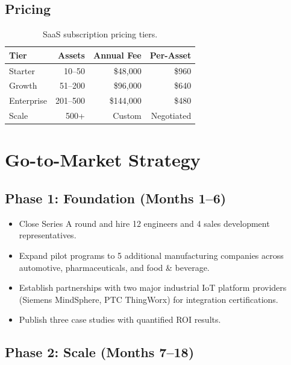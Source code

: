 \documentclass[
    language=english,
    doctype=business-plan,
    institution=none,
]{../../omnilatex}
\begin{document}
\subsection{Pricing}

\begin{table}[h]
    \centering
    \begin{tabular}{lrrr}
        \toprule
        \textbf{Tier} & \textbf{Assets} & \textbf{Annual Fee} & \textbf{Per-Asset} \\
        \midrule
        Starter   & 10--50    & \$48,000  & \$960  \\
        Growth    & 51--200   & \$96,000  & \$640  \\
        Enterprise & 201--500 & \$144,000 & \$480  \\
        Scale     & 500+      & Custom    & Negotiated \\
        \bottomrule
    \end{tabular}
    \caption{SaaS subscription pricing tiers.}
\end{table}

\section{Go-to-Market Strategy}

\subsection{Phase 1: Foundation (Months 1--6)}

\begin{itemize}
    \item Close Series A round and hire 12 engineers and 4 sales
          development representatives.
    \item Expand pilot programs to 5 additional manufacturing companies
          across automotive, pharmaceuticals, and food \& beverage.
    \item Establish partnerships with two major industrial IoT platform
          providers (Siemens MindSphere, PTC ThingWorx) for integration
          certifications.
    \item Publish three case studies with quantified ROI results.
\end{itemize}

\subsection{Phase 2: Scale (Months 7--18)}
\end{document}
